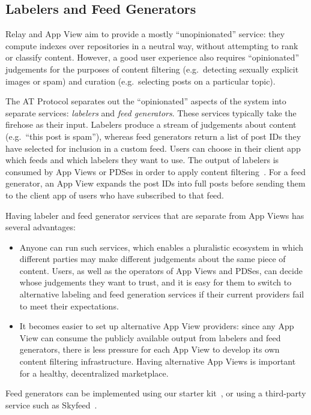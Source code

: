 \documentclass[sigconf]{acmart}
\begin{document}
\subsection{Labelers and Feed Generators}\label{sec:labeling}

Relay and App View aim to provide a mostly ``unopinionated'' service: they compute indexes over repositories in a neutral way, without attempting to rank or classify content.
However, a good user experience also requires ``opinionated'' judgements for the purposes of content filtering (e.g.\ detecting sexually explicit images or spam) and curation (e.g.\ selecting posts on a particular topic).

The AT Protocol separates out the ``opinionated'' aspects of the system into separate services: \emph{labelers} and \emph{feed generators}.
These services typically take the firehose as their input.
Labelers produce a stream of judgements about content (e.g.\ ``this post is spam''), whereas feed generators return a list of post IDs they have selected for inclusion in a custom feed.
Users can choose in their client app which feeds and which labelers they want to use.
The output of labelers is consumed by App Views or PDSes in order to apply content filtering~\cite{Labeling}.
For a feed generator, an App View expands the post IDs into full posts before sending them to the client app of users who have subscribed to that feed.

Having labeler and feed generator services that are separate from App Views has several advantages:
\begin{itemize}
    \item Anyone can run such services, which enables a pluralistic ecosystem in which different parties may make different judgements about the same piece of content.
        Users, as well as the operators of App Views and PDSes, can decide whose judgements they want to trust, and it is easy for them to switch to alternative labeling and feed generation services if their current providers fail to meet their expectations.
    \item It becomes easier to set up alternative App View providers: since any App View can consume the publicly available output from labelers and feed generators, there is less pressure for each App View to develop its own content filtering infrastructure.
        Having alternative App Views is important for a healthy, decentralized marketplace.
\end{itemize}

Feed generators can be implemented using our starter kit~\cite{FeedGeneratorKit}, or using a third-party service such as Skyfeed~\cite{Skyfeed}.
\end{document}
